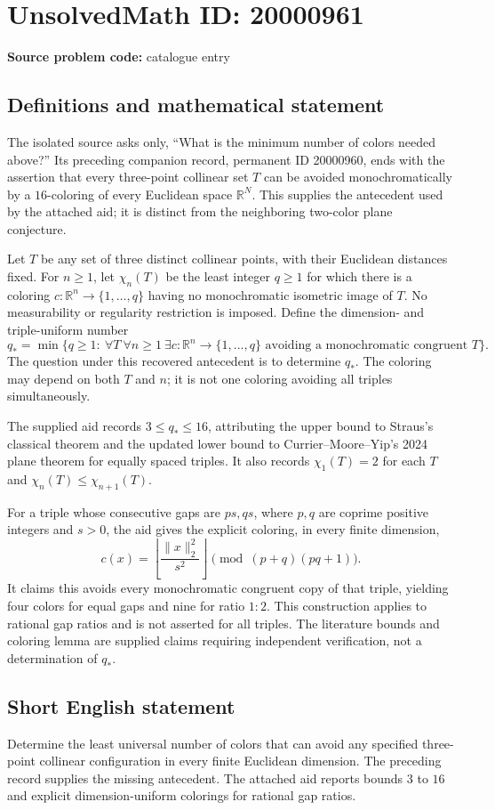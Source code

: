 \documentclass[11pt]{article}
\newcommand{\R}{\mathbb{R}}
\begin{document}
\section*{UnsolvedMath ID: 20000961}
\textbf{Source problem code:} catalogue entry
\subsection{Definitions and mathematical statement}
The isolated source asks only, ``What is the minimum number of colors needed above?'' Its preceding companion record, permanent ID 20000960, ends with the assertion that every three-point collinear set $T$ can be avoided monochromatically by a $16$-coloring of every Euclidean space $\R^N$. This supplies the antecedent used by the attached aid; it is distinct from the neighboring two-color plane conjecture.

Let $T$ be any set of three distinct collinear points, with their Euclidean distances fixed. For $n\geq1$, let $\chi_n(T)$ be the least integer $q\geq1$ for which there is a coloring $c:\R^n\to\{1,\ldots,q\}$ having no monochromatic isometric image of $T$. No measurability or regularity restriction is imposed. Define the dimension- and triple-uniform number
\[
 q_* =\min\{q\geq1:\ \forall T\ \forall n\geq1\ \exists c:\R^n\to\{1,\ldots,q\}
 \text{ avoiding a monochromatic congruent }T\}.
\]
The question under this recovered antecedent is to determine $q_*$. The coloring may depend on both $T$ and $n$; it is not one coloring avoiding all triples simultaneously.

The supplied aid records $3\leq q_*\leq16$, attributing the upper bound to Straus's classical theorem and the updated lower bound to Currier--Moore--Yip's 2024 plane theorem for equally spaced triples. It also records $\chi_1(T)=2$ for each $T$ and $\chi_n(T)\leq\chi_{n+1}(T)$.

For a triple whose consecutive gaps are $ps,qs$, where $p,q$ are coprime positive integers and $s>0$, the aid gives the explicit coloring, in every finite dimension,
\[
 c(x)=\left\lfloor\frac{\|x\|_2^2}{s^2}\right\rfloor
 \pmod{(p+q)(pq+1)}.
\]
It claims this avoids every monochromatic congruent copy of that triple, yielding four colors for equal gaps and nine for ratio $1:2$. This construction applies to rational gap ratios and is not asserted for all triples. The literature bounds and coloring lemma are supplied claims requiring independent verification, not a determination of $q_*$.
\subsection{Short English statement}
Determine the least universal number of colors that can avoid any specified three-point collinear configuration in every finite Euclidean dimension. The preceding record supplies the missing antecedent. The attached aid reports bounds $3$ to $16$ and explicit dimension-uniform colorings for rational gap ratios.
\end{document}
